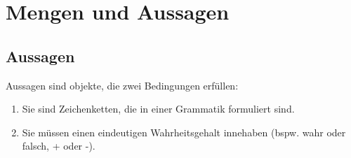 \section{Mengen und Aussagen}
\subsection{Aussagen}
Aussagen sind objekte, die zwei Bedingungen erfüllen:
\begin{enumerate}
    \item Sie sind Zeichenketten, die in einer Grammatik formuliert sind.
    \item Sie müssen einen eindeutigen Wahrheitsgehalt innehaben (bspw. wahr oder falsch, + oder -).
\end{enumerate}

